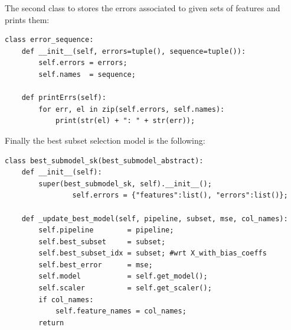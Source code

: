 \documentclass[12pt, letterpaper]{article}
\theoremstyle{definition}
\begin{document}
The second class to stores the errors associated to given sets of features and prints them:
\begin{lstlisting}
class error_sequence:
    def __init__(self, errors=tuple(), sequence=tuple()):
        self.errors = errors;
        self.names  = sequence;
    
    def printErrs(self):
        for err, el in zip(self.errors, self.names):
            print(str(el) + ": " + str(err));
\end{lstlisting}
Finally the best subset selection model is the following:
\begin{lstlisting}
class best_submodel_sk(best_submodel_abstract):
    def __init__(self):
        super(best_submodel_sk, self).__init__();
                self.errors = {"features":list(), "errors":list()};
       
    def _update_best_model(self, pipeline, subset, mse, col_names):
        self.pipeline        = pipeline;
        self.best_subset     = subset;
        self.best_subset_idx = subset; #wrt X_with_bias_coeffs
        self.best_error      = mse;
        self.model           = self.get_model();
        self.scaler          = self.get_scaler();
        if col_names:
            self.feature_names = col_names;
        return 
    

\end{lstlisting}
\end{document}

